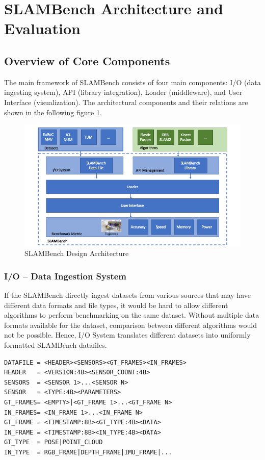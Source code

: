 \section{SLAMBench Architecture and Evaluation}

\subsection{Overview of Core Components}
The main framework of SLAMBench consists of four main components: I/O (data ingesting system), API (library integration), Loader (middleware), and User Interface (visualization). 
The architectural components and their relations are shown in the following figure \ref{fig:sb}. 

\begin{figure}[h]
	\caption{\label{fig:sb}SLAMBench Design Architecture \cite{bodin2018slambench2}}
	\includegraphics[width=14cm]{figures/slambench-architecture.png}
	\centering
\end{figure}

\subsubsection*{I/O – Data Ingestion System}

If the SLAMBench directly ingest datasets from various sources that may have different data formats and file types, it would be hard to allow different algorithms to perform benchmarking on the same dataset. Without multiple data formats available for the dataset, comparison between different algorithms would not be possible. Hence, I/O System translates different datasets into uniformly formatted SLAMBench datafiles. 
\begin{lstlisting}
DATAFILE = <HEADER><SENSORS><GT_FRAMES><IN_FRAMES>
HEADER   = <VERSION:4B><SENSOR_COUNT:4B>
SENSORS  = <SENSOR 1>...<SENSOR N>
SENSOR   = <TYPE:4B><PARAMETERS>
GT_FRAMES= <EMPTY>|<GT_FRAME 1>...<GT_FRAME N>
IN_FRAMES= <IN_FRAME 1>...<IN_FRAME N>
GT_FRAME = <TIMESTAMP:8B><GT_TYPE:4B><DATA>
IN_FRAME = <TIMESTAMP:8B><IN_TYPE:4B><DATA>
GT_TYPE  = POSE|POINT_CLOUD
IN_TYPE  = RGB_FRAME|DEPTH_FRAME|IMU_FRAME|...
\end{lstlisting}

